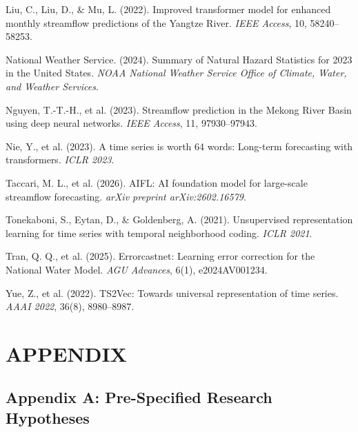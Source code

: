 \documentclass[12pt]{report}
\begin{document}
\begin{enumerate}[label={[\arabic*]}]
  \item Liu, C., Liu, D., \& Mu, L. (2022). Improved transformer model for enhanced monthly streamflow predictions of the Yangtze River. \textit{IEEE Access}, 10, 58240--58253.

  \item National Weather Service. (2024). Summary of Natural Hazard Statistics for 2023 in the United States. \textit{NOAA National Weather Service Office of Climate, Water, and Weather Services}.

  \item Nguyen, T.-T.-H., et al. (2023). Streamflow prediction in the Mekong River Basin using deep neural networks. \textit{IEEE Access}, 11, 97930--97943.

  \item Nie, Y., et al. (2023). A time series is worth 64 words: Long-term forecasting with transformers. \textit{ICLR 2023}.

  \item Taccari, M. L., et al. (2026). AIFL: AI foundation model for large-scale streamflow forecasting. \textit{arXiv preprint arXiv:2602.16579}.

  \item Tonekaboni, S., Eytan, D., \& Goldenberg, A. (2021). Unsupervised representation learning for time series with temporal neighborhood coding. \textit{ICLR 2021}.

  \item Tran, Q. Q., et al. (2025). Errorcastnet: Learning error correction for the National Water Model. \textit{AGU Advances}, 6(1), e2024AV001234.

  \item Yue, Z., et al. (2022). TS2Vec: Towards universal representation of time series. \textit{AAAI 2022}, 36(8), 8980--8987.
\end{enumerate}


\chapter*{APPENDIX}
\setcounter{table}{0}
\renewcommand{\thetable}{A.\arabic{table}}

\section*{Appendix A: Pre-Specified Research Hypotheses}
\end{document}
